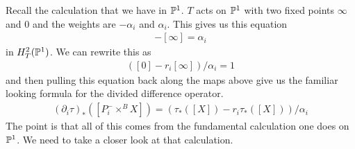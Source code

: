 \documentclass[12pt]{article}
\begin{document}
\hfill

Recall the calculation that we have in $\P^1$. $T$ acts on $\P^1$ with two fixed points $\infty$ and $0$ and the weights
are $-\alpha_i$ and $\alpha_i$. This gives us this equation \begin{align*}
	[0] - [\infty] = \alpha_i
\end{align*} in $H_T^2(\P^1)$. We can rewrite this as \begin{align*}
	([0] - r_i[\infty])/\alpha_i = 1
\end{align*} and then pulling this equation back along the maps above give us the familiar looking formula for
the divided difference operator. \begin{align*}
	(\partial_i\tau)_*([P_i^-\times^B X]) = (\tau_*([X]) - r_i\tau_*([X]))/\alpha_i
\end{align*}
The point is that all of this comes from the fundamental calculation one does on $\P^1$. We need to take a closer look at that
calculation.
\end{document}
